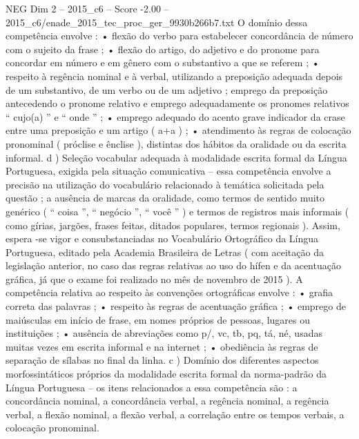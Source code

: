 \begin{textsample}{NEG Dim 2 – 2015\_c6 – Score -2.00 – 2015\_c6/enade\_2015\_tec\_proc\_ger\_9930b266b7.txt}
O domínio dessa competência envolve : • flexão do verbo para estabelecer concordância de número com o sujeito da frase ; • flexão do artigo, do adjetivo e do pronome para concordar em número e em gênero com o substantivo a que se referem ; • respeito à regência nominal e à verbal, utilizando a preposição adequada depois de um substantivo, de um verbo ou de um adjetivo ; emprego da preposição antecedendo o pronome relativo e emprego adequadamente os pronomes relativos “ cujo(a) ” e “ onde ” ; • emprego adequado do acento grave indicador da crase entre uma preposição e um artigo ( a+a ) ; • atendimento às regras de colocação pronominal ( próclise e ênclise ), distintas dos hábitos da oralidade ou da escrita informal. d ) Seleção vocabular adequada à modalidade escrita formal da Língua Portuguesa, exigida pela situação comunicativa – essa competência envolve a precisão na utilização do vocabulário relacionado à temática solicitada pela questão ; a ausência de marcas da oralidade, como termos de sentido muito genérico ( “ coisa ”, “ negócio ”, “ você ” ) e termos de registros mais informais ( como gírias, jargões, frases feitas, ditados populares, termos regionais ).
Assim, espera -se vigor e consubstanciadas no Vocabulário Ortográfico da Língua Portuguesa, editado pela Academia Brasileira de Letras ( com aceitação da legislação anterior, no caso das regras relativas ao uso do hífen e da acentuação gráfica, já que o exame foi realizado no mês de novembro de 2015 ).
A competência relativa ao respeito às convenções ortográficas envolve : • grafia correta das palavras ; • respeito às regras de acentuação gráfica ; • emprego de maiúsculas em início de frase, em nomes próprios de pessoas, lugares ou instituições ; • ausência de abreviações como p/, vc, tb, pq, tá, né, usadas muitas vezes em escrita informal e na internet ; • obediência às regras de separação de sílabas no final da linha. c ) Domínio dos diferentes aspectos morfossintáticos próprios da modalidade escrita formal da norma-padrão da Língua Portuguesa – os itens relacionados a essa competência são : a concordância nominal, a concordância verbal, a regência nominal, a regência verbal, a flexão nominal, a flexão verbal, a correlação entre os tempos verbais, a colocação pronominal.

\end{textsample}
